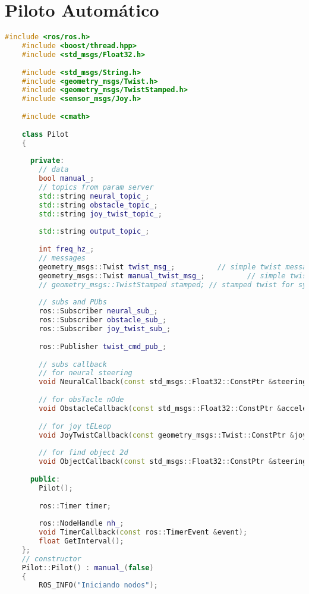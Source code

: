 \section{Piloto Automático}

\begin{lstlisting}[title={pilot\_node.cpp},language=c++]
    #include <ros/ros.h>
    #include <boost/thread.hpp>
    #include <std_msgs/Float32.h>
    
    #include <std_msgs/String.h>
    #include <geometry_msgs/Twist.h>
    #include <geometry_msgs/TwistStamped.h>
    #include <sensor_msgs/Joy.h>
    
    #include <cmath>
    
    class Pilot
    {
    
      private:
        // data
        bool manual_;
        // topics from param server
        std::string neural_topic_;
        std::string obstacle_topic_;
        std::string joy_twist_topic_;
    
        std::string output_topic_;
    
        int freq_hz_;
        // messages
        geometry_msgs::Twist twist_msg_;          // simple twist message from joystick
        geometry_msgs::Twist manual_twist_msg_;          // simple twist message from joystick
        // geometry_msgs::TwistStamped stamped; // stamped twist for sync
    
        // subs and PUbs
        ros::Subscriber neural_sub_;
        ros::Subscriber obstacle_sub_;
        ros::Subscriber joy_twist_sub_;
    
        ros::Publisher twist_cmd_pub_;
    
        // subs callback
        // for neural steering
        void NeuralCallback(const std_msgs::Float32::ConstPtr &steering);
    
        // for obsTacle nOde
        void ObstacleCallback(const std_msgs::Float32::ConstPtr &acceleration);
    
        // for joy tELeop
        void JoyTwistCallback(const geometry_msgs::Twist::ConstPtr &joy_twist);
    
        // for find object 2d
        void ObjectCallback(const std_msgs::Float32::ConstPtr &steering);
    
      public:
        Pilot();
    
        ros::Timer timer;
    
        ros::NodeHandle nh_;
        void TimerCallback(const ros::TimerEvent &event);
        float GetInterval();
    };
    // constructor
    Pilot::Pilot() : manual_(false)
    {
        ROS_INFO("Iniciando nodos");
    

\end{lstlisting}
